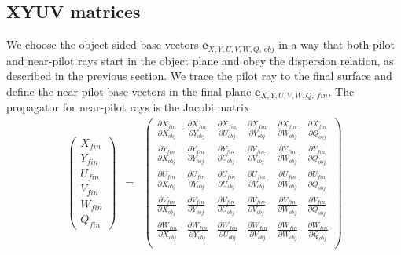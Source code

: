 \documentclass[12pt,a4paper,twoside,openright,BCOR10mm,headsepline,titlepage,abstracton,chapterprefix,final]{scrreprt}
\newcommand\Vector[1]{{\mathbf{#1}}}
\begin{document}
\subsection{XYUV matrices}
We choose the object sided base vectors 
$\Vector{e}_{X,Y,U,V,W,Q,\,obj}$ 
in a way that both pilot and near-pilot rays start in the object plane and obey the dispersion relation, 
as described in the previous section.
We trace the pilot ray to the final surface 
and define the near-pilot base vectors in the final plane
$\Vector{e}_{X,Y,U,V,W,Q,\,fin}$.
The propagator for near-pilot rays is the Jacobi matrix
\begin{eqnarray}
 \begin{pmatrix}
  X_{fin} \\[2ex] Y_{fin} \\[2ex] U_{fin}\\[2ex] V_{fin} \\[2ex] W_{fin} \\[2ex] Q_{fin} 
 \end{pmatrix}
 &=&
 \begin{pmatrix}
  \frac{\partial X_{fin}}{\partial X_{obj}} & \frac{\partial X_{fin}}{\partial Y_{obj}} & \frac{\partial X_{fin}}{\partial U_{obj}} & \frac{\partial X_{fin}}{\partial V_{obj}} & \frac{\partial X_{fin}}{\partial W_{obj}} & \frac{\partial X_{fin}}{\partial Q_{obj}} \\[2ex]
  \frac{\partial Y_{fin}}{\partial X_{obj}} & \frac{\partial Y_{fin}}{\partial Y_{obj}} & \frac{\partial Y_{fin}}{\partial U_{obj}} & \frac{\partial Y_{fin}}{\partial V_{obj}} & \frac{\partial Y_{fin}}{\partial W_{obj}} & \frac{\partial Y_{fin}}{\partial Q_{obj}} \\[2ex]
  \frac{\partial U_{fin}}{\partial X_{obj}} & \frac{\partial U_{fin}}{\partial Y_{obj}} & \frac{\partial U_{fin}}{\partial U_{obj}} & \frac{\partial U_{fin}}{\partial V_{obj}} & \frac{\partial U_{fin}}{\partial W_{obj}} & \frac{\partial U_{fin}}{\partial Q_{obj}} \\[2ex]
  \frac{\partial V_{fin}}{\partial X_{obj}} & \frac{\partial V_{fin}}{\partial Y_{obj}} & \frac{\partial V_{fin}}{\partial U_{obj}} & \frac{\partial V_{fin}}{\partial V_{obj}} & \frac{\partial V_{fin}}{\partial W_{obj}} & \frac{\partial V_{fin}}{\partial Q_{obj}} \\[2ex]
  \frac{\partial W_{fin}}{\partial X_{obj}} & \frac{\partial W_{fin}}{\partial Y_{obj}} & \frac{\partial W_{fin}}{\partial U_{obj}} & \frac{\partial W_{fin}}{\partial V_{obj}} & \frac{\partial W_{fin}}{\partial W_{obj}} & \frac{\partial W_{fin}}{\partial Q_{obj}} \\[2ex]

\end{pmatrix}
\end{eqnarray}
\end{document}
